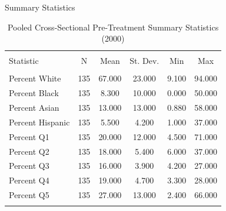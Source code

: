 \documentclass[11pt,ignorenonframetext,]{beamer}
\begin{document}
\begin{frame}{Summary Statistics}
\protect\hypertarget{summary-statistics}{}

\begin{table}[!htbp] \centering 
  \caption{Pooled Cross-Sectional Pre-Treatment Summary Statistics (2000)} 
  \label{} 
\begin{tabular}{@{\extracolsep{5pt}}lccccc} 
\\[-1.8ex]\hline 
\hline \\[-1.8ex] 
Statistic & \multicolumn{1}{c}{N} & \multicolumn{1}{c}{Mean} & \multicolumn{1}{c}{St. Dev.} & \multicolumn{1}{c}{Min} & \multicolumn{1}{c}{Max} \\ 
\hline \\[-1.8ex] 
Percent White & 135 & 67.000 & 23.000 & 9.100 & 94.000 \\ 
Percent Black & 135 & 8.300 & 10.000 & 0.000 & 50.000 \\ 
Percent Asian & 135 & 13.000 & 13.000 & 0.880 & 58.000 \\ 
Percent Hispanic & 135 & 5.500 & 4.200 & 1.000 & 37.000 \\ 
Percent Q1 & 135 & 20.000 & 12.000 & 4.500 & 71.000 \\ 
Percent Q2 & 135 & 18.000 & 5.400 & 6.000 & 37.000 \\ 
Percent Q3 & 135 & 16.000 & 3.900 & 4.200 & 27.000 \\ 
Percent Q4 & 135 & 19.000 & 4.700 & 3.300 & 28.000 \\ 
Percent Q5 & 135 & 27.000 & 13.000 & 2.400 & 66.000 \\ 
\hline \\[-1.8ex] 
\end{tabular} 
\end{table}

\end{frame}
\end{document}
